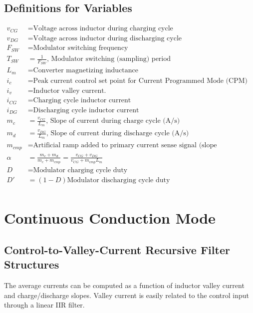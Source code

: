 \documentclass{scrartcl}
\begin{document}
		\subsection{Definitions for Variables}
			
			\begin{align*}
			v_{CG} &= \text{Voltage across inductor during charging cycle} \\
			v_{DG} &= \text{Voltage across inductor during discharging cycle} \\
			F_{SW} &= \text{Modulator switching frequency}\\
			T_{SW} &= \frac{1}{F_{SW}}\text{, Modulator switching (sampling) period} \\
			L_m &= \text{Converter magnetizing inductance} \\
			i_c &= \text{Peak current control set point for Current Programmed Mode (CPM) control}\\
				i_v &= \text{Inductor valley current.} \\
			i_{CG} &= \text{Charging cycle inductor current} \\
			i_{DG} &= \text{Discharging cycle inductor current} \\	
			m_c &= \frac{v_{CG}} {L_m}\text{, Slope of current during charge cycle (A/s)} \\
			m_d &= \frac{v_{DG}} {L_m}\text{, Slope of current during discharge cycle (A/s)}\\
			m_{cmp} &= \text{Artificial ramp added to primary current sense signal (slope compensation) (A/s)}\\
			\alpha &= \frac{m_c + m_d} {m_c + m_{cmp}} =  \frac{v_{CG} + v_{DG}} {v_{CG} + m_{cmp} L_m}\\
			D &= \text{Modulator charging cycle duty} \\
			D' &= (1-D) \text{Modulator discharging cycle duty}\\	
			\end{align*}

	\section{Continuous Conduction Mode}
		\subsection{Control-to-Valley-Current Recursive Filter Structures}
		The average currents can be computed as a function of inductor valley current and charge/discharge slopes.  Valley current is easily related to the control input through a linear IIR filter.
\end{document}
